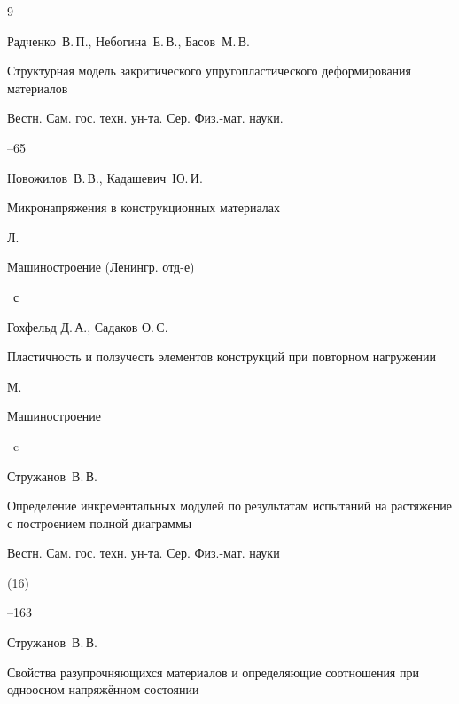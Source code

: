 \begin{thebibliography}{9}


\by Радченко~В.\,П., Небогина~Е.\,В., Басов~М.\,В.

\paper Структурная модель закритического упругопластического деформирования материалов

\jour Вестн. Сам. гос. техн. ун-та. Сер. Физ.-мат. науки.



--65




\by Новожилов~В.\,В., Кадашевич~Ю.\,И.

\book Микронапряжения в конструкционных материалах

\publaddr Л.

\publ Машиностроение (Ленингр. отд-е)


~с




\by Гохфельд Д.\,А., Садаков О.\,С.

\book Пластичность и ползучесть элементов конструкций при повторном нагружении

\publaddr М.

\publ Машиностроение


~c






\by Стружанов~В.\,В.

\paper Определение инкрементальных модулей по результатам испытаний на растяжение с построением полной диаграммы

\jour Вестн. Сам. гос. техн. ун-та. Сер. Физ.-мат. науки


(16)

--163




\by Стружанов~В.\,В.

\paper Свойства разупрочняющихся материалов и определяющие соотношения при одноосном напряжённом состоянии


\end{thebibliography}
